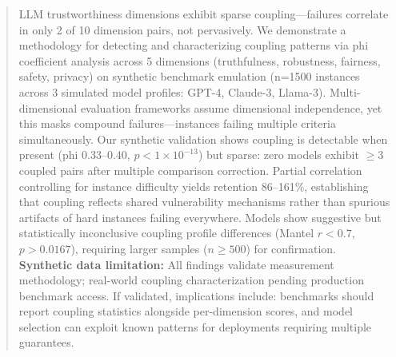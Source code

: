\begin{abstract}
LLM trustworthiness dimensions exhibit sparse coupling---failures correlate in only 2 of 10 dimension pairs, not pervasively. We demonstrate a methodology for detecting and characterizing coupling patterns via phi coefficient analysis across 5 dimensions (truthfulness, robustness, fairness, safety, privacy) on synthetic benchmark emulation (n=1500 instances across 3 simulated model profiles: GPT-4, Claude-3, Llama-3). Multi-dimensional evaluation frameworks assume dimensional independence, yet this masks compound failures---instances failing multiple criteria simultaneously. Our synthetic validation shows coupling is detectable when present (phi 0.33--0.40, $p < 1\times10^{-13}$) but sparse: zero models exhibit $\geq$3 coupled pairs after multiple comparison correction. Partial correlation controlling for instance difficulty yields retention 86--161\%, establishing that coupling reflects shared vulnerability mechanisms rather than spurious artifacts of hard instances failing everywhere. Models show suggestive but statistically inconclusive coupling profile differences (Mantel $r < 0.7$, $p > 0.0167$), requiring larger samples ($n \geq 500$) for confirmation. \textbf{Synthetic data limitation:} All findings validate measurement methodology; real-world coupling characterization pending production benchmark access. If validated, implications include: benchmarks should report coupling statistics alongside per-dimension scores, and model selection can exploit known patterns for deployments requiring multiple guarantees.
\end{abstract}
